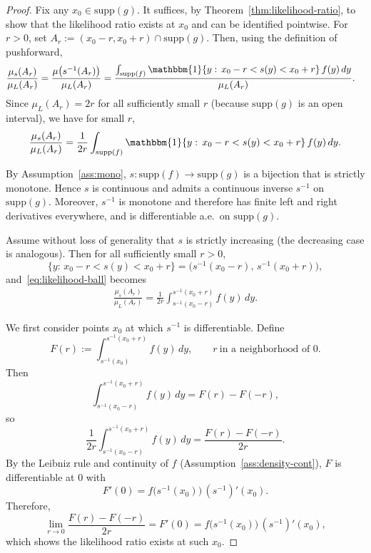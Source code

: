 \documentclass[12pt,leqno]{amsart}
\begin{document}
\begin{proof}
Fix any $x_0\in \mathrm{supp}(g)$. It suffices, by Theorem~\ref{thm:likelihood-ratio},
to show that the likelihood ratio exists at $x_0$ and can be identified pointwise.
For $r>0$, set $A_r:=(x_0-r,x_0+r)\cap \mathrm{supp}(g)$.
Then, using the definition of pushforward,
\begin{align*}
\frac{\mu_s(A_r)}{\mu_L(A_r)}
&= \frac{\mu\big(s^{-1}(A_r)\big)}{\mu_L(A_r)}
 = \frac{\int_{\mathrm{supp}(f)} \mathbbm{1}\{y:\, x_0-r<s(y)<x_0+r\}\, f(y)\,dy}{\mu_L(A_r)} .
\end{align*}
Since $\mu_L(A_r)=2r$ for all sufficiently small $r$ (because $\mathrm{supp}(g)$ is an open interval),
we have for small $r$,
\begin{align}
\frac{\mu_s(A_r)}{\mu_L(A_r)}
= \frac{1}{2r}\int_{\mathrm{supp}(f)} \mathbbm{1}\{y:\, x_0-r<s(y)<x_0+r\}\, f(y)\,dy .
\label{eq:likelihood-ball}
\end{align}

By Assumption~\ref{ass:mono}, $s:\mathrm{supp}(f)\to\mathrm{supp}(g)$ is a bijection that is strictly monotone.
Hence $s$ is continuous and admits a continuous inverse $s^{-1}$ on $\mathrm{supp}(g)$.
Moreover, $s^{-1}$ is monotone and therefore has finite left and right derivatives everywhere, and is differentiable a.e.\ on $\mathrm{supp}(g)$.

Assume without loss of generality that $s$ is strictly increasing (the decreasing case is analogous).
Then for all sufficiently small $r>0$,
\[
\{y:\, x_0-r<s(y)<x_0+r\} = \big(s^{-1}(x_0-r),\, s^{-1}(x_0+r)\big),
\]
and~\eqref{eq:likelihood-ball} becomes
\begin{align}
\frac{\mu_s(A_r)}{\mu_L(A_r)}
= \frac{1}{2r}\int_{s^{-1}(x_0-r)}^{s^{-1}(x_0+r)} f(y)\,dy .
\label{eq:likelihood-interval}
\end{align}

We first consider points $x_0$ at which $s^{-1}$ is differentiable.
Define
\[
F(r):=\int_{s^{-1}(x_0)}^{s^{-1}(x_0+r)} f(y)\,dy,
\qquad r \ \text{in a neighborhood of }0.
\]
Then
\[
\int_{s^{-1}(x_0-r)}^{s^{-1}(x_0+r)} f(y)\,dy
= F(r)-F(-r),
\]
so
\[
\frac{1}{2r}\int_{s^{-1}(x_0-r)}^{s^{-1}(x_0+r)} f(y)\,dy
= \frac{F(r)-F(-r)}{2r}.
\]
By the Leibniz rule and continuity of $f$ (Assumption~\ref{ass:density-cont}),
$F$ is differentiable at $0$ with
\[
F'(0)= f\big(s^{-1}(x_0)\big)\,(s^{-1})'(x_0).
\]
Therefore,
\[
\lim_{r\rightarrow0}\frac{F(r)-F(-r)}{2r} = F'(0)= f\big(s^{-1}(x_0)\big)\,(s^{-1})'(x_0),
\]
which shows the likelihood ratio exists at such $x_0$.


\end{proof}
\end{document}
